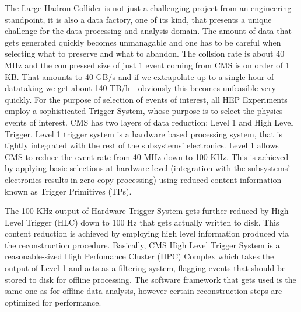 The Large Hadron Collider is not just a challenging project from an engineering standpoint, it is also a data factory, one of its kind, that presents a unique challenge for the data processing and analysis domain. The amount of data that gets generated quickly becomes unmanagable and one has to be careful when selecting what to preserve and what to abandon. The collsion rate is about 40 MHz and the compressed size of just 1 event coming from CMS is on order of 1 KB. That amounts to 40 GB/s and if we extrapolate up to a single hour of datataking we get about 140 TB/h - obviously this becomes unfeasible very quickly. For the purpose of selection of events of interest, all HEP Experiments employ a sophisticated Trigger System, whose purpose is to select the physics events of interest. CMS has two layers of data reduction: Level 1 and High Level Trigger. Level 1 trigger system is a hardware based processing system, that is tightly integrated with the rest of the subsystems' electronics. Level 1 allows CMS to reduce the event rate from 40 MHz down to 100 KHz. This is achieved by applying basic selections at hardware level (integration with the subsystems' electronics results in zero copy processing) using reduced content information known as Trigger Primitives (TPs).

The 100 KHz output of Hardware Trigger System gets further reduced by High Level Trigger (HLC) down to 100 Hz that gets actually written to disk. This content reduction is achieved by employing high level information produced via the reconstruction procedure. Basically, CMS High Level Trigger System is a reasonable-sized High Perfomance Cluster (HPC) Complex which takes the output of Level 1 and acts as a filtering system, flagging events that should be stored to disk for offline processing. The software framework that gets used is the same one as for offline data analysis, however certain reconstruction steps are optimized for performance.



